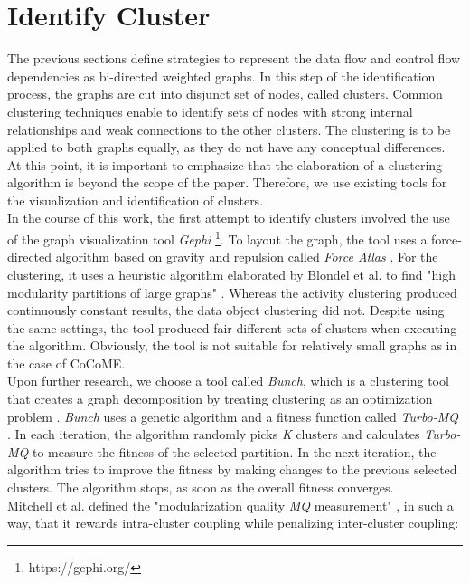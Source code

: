\section{Identify Cluster}
\label{sec:Solution:IdentifyCluster}
The previous sections define strategies to represent the data flow and control flow dependencies as bi-directed weighted graphs. In this step of the identification process, the graphs are cut into disjunct set of nodes, called clusters. Common clustering techniques enable to identify sets of nodes with strong internal relationships and weak connections to the other clusters. The clustering is to be applied to both graphs equally, as they do not have any conceptual differences. At this point, it is important to emphasize that the elaboration of a clustering algorithm is beyond the scope of the paper. Therefore, we use existing tools for the visualization and identification of clusters. \\
In the course of this work, the first attempt to identify clusters involved the use of the graph visualization tool \textit{Gephi} \footnote{https://gephi.org/}. To layout the graph, the tool uses a force-directed algorithm based on gravity and repulsion called \textit{Force Atlas} \cite{gephi}. For the clustering, it uses a heuristic algorithm elaborated by Blondel et al. to find "high modularity partitions of large graphs" \cite{modularity}. Whereas the activity clustering produced continuously constant results, the data object clustering did not. Despite using the same settings, the tool produced fair different sets of clusters when executing the algorithm. Obviously, the tool is not suitable for relatively small graphs as in the case of CoCoME.  \\
Upon further research, we choose a tool called \textit{Bunch}, which is a clustering tool that creates a graph decomposition by treating clustering as an optimization problem \cite{bunch}. \textit{Bunch} uses a genetic algorithm and a fitness function called \textit{Turbo-MQ} \cite{turbo-MQ}. In each iteration, the algorithm randomly picks \textit{K} clusters and calculates \textit{Turbo-MQ} to measure the fitness of the selected partition. In the next iteration, the algorithm tries to improve the fitness by making changes to the previous selected clusters. The algorithm stops, as soon as the overall fitness converges.\\
Mitchell et al. defined the "modularization quality \textit{MQ} measurement" \cite{turbo-MQ}, in such a way, that it rewards intra-cluster coupling while penalizing inter-cluster coupling:

